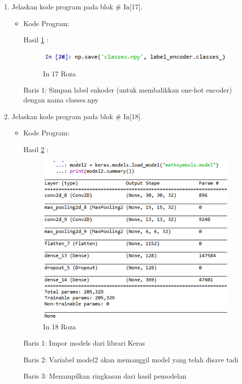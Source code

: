 \begin{enumerate}
\item Jelaskan kode program pada blok \# In[17].
\begin{itemize}
\item Kode Program:

\par Hasil \ref{in17roza} :
\begin{figure}[!hbtp]
\centering
\includegraphics[scale=0.7]{figures/prak17roza.png}
\caption{In 17 Roza}
\label{in17roza}
\end{figure}
\par Baris 1: Simpan label enkoder (untuk membalikkan one-hot encoder) dengan nama classes.npy
\end{itemize}
\par

\item Jelaskan kode program pada blok \# In[18].
\begin{itemize}
\item Kode Program:

\par Hasil \ref{in18roza} :
\begin{figure}[!hbtp]
\centering
\includegraphics[scale=0.7]{figures/prak18roza.png}
\caption{In 18 Roza}
\label{in18roza}
\end{figure}
\par Baris 1: Impor models dari librari Keras
\par Baris 2: Variabel model2 akan memanggil model yang telah disave tadi 
\par Baris 3:  Menampilkan ringkasan dari hasil pemodelan
\end{itemize}
\par



\end{enumerate}
